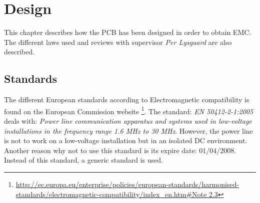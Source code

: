 \chapter{Design}
This chapter describes how the PCB has been designed in order to obtain EMC. The different laws used and reviews with supervisor \textit{Per Lysgaard} are also described. 

\section{Standards}
The different European standards according to Electromagnetic compatibility is found on the European Commission website \footnote{\url{http://ec.europa.eu/enterprise/policies/european-standards/harmonised-standards/electromagnetic-compatibility/index\_en.htm\#Note 2.3}}.
The standard: \textit{EN 50412-2-1:2005} deals with: \textit{Power line communication apparatus and systems used in low-voltage installations in the frequency range 1.6 MHz to 30 MHz}. However, the power line is not to work on a low-voltage installation but in an isolated DC environment. Another reason why not to use this standard is its expire date: 01/04/2008. Instead of this standard, a generic standard is used.

